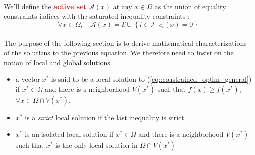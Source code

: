 \documentclass[a4paper]{article}
\begin{document}
{		\paragraph{} We'll define the \textcolor{red}{\textbf{active set}} $\mathcal{A}(x)$ at any $x\in\Omega$ as the union of equality constraints indices with the saturated inequality constraints : 
		\begin{equation}
			\forall{x}\in\Omega, \quad \mathcal{A}(x) = \mathcal{E} \cup \left\{ i \in \mathcal{I} \, \vert \, c_i(x) = 0\right\} 
		\end{equation}
		
				
		\paragraph{} The purpose of the following section is to derive mathematical characterizations of the solutions to the previous equation. We therefore need to insist on the notion of local and global solutions. 
		\begin{itemize}
			\item a vector $x^*$ is said to be a local solution to (\ref{eq::constrained_optim_general}) if $x^*\in\Omega$ and there is a neighborhood $V(x^*)$ such that $f(x)\geq f(x^*)$, $\forall{x}\in\Omega\cap V(x^*)$. 
			\item $x^*$ is a \emph{strict} local solution if the last inequality is strict. 
			\item $x^*$ is an isolated local solution if $x^*\in\Omega$ and there is a neighborhood $V(x^*)$ such that $x^*$ is the only local solution in $\Omega\cap V(x^*)$
		\end{itemize}
	}
	
\end{document}

